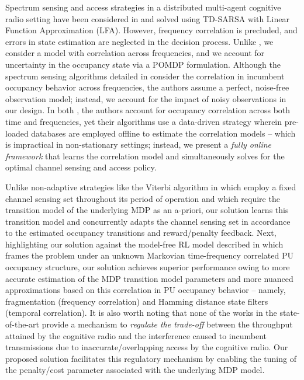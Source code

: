 \documentclass[10pt,twocolumn]{IEEEtran}
\begin{document}
Spectrum sensing and access strategies in a distributed multi-agent cognitive radio setting have been considered in \cite{6507570} and solved using TD-SARSA with Linear Function Approximation (LFA). However, frequency correlation is precluded, and errors in state estimation are neglected in the decision process. Unlike \cite{6507570}, we consider a model with correlation across frequencies, and we account for uncertainty in the occupancy state via a POMDP formulation. Although the spectrum sensing algorithms detailed in \cite{6956794} consider the correlation in incumbent occupancy behavior across frequencies, the authors assume a perfect, noise-free observation model; instead, we account for the impact of noisy observations in our design. In both \cite{6956794, 4554696}, the authors account for occupancy correlation across both time and frequencies, yet their algorithms use a data-driven strategy wherein pre-loaded databases are employed offline to estimate the correlation models -- which is impractical in non-stationary settings; instead, we present a \emph{fully online framework} that learns the correlation model and simultaneously solves for the optimal channel sensing and access policy. 

Unlike non-adaptive strategies like the Viterbi algorithm in \cite{4554696} which employ a fixed channel sensing set throughout its period of operation and which require the transition model of the underlying MDP as an a-priori, our solution learns this transition model and concurrently adapts the channel sensing set in accordance to the estimated occupancy transitions and reward/penalty feedback. Next, highlighting our solution against the model-free RL model described in \cite{DQN} which frames the problem under an unknown Markovian time-frequency correlated PU occupancy structure, our solution achieves superior performance owing to more accurate estimation of the MDP transition model parameters and more nuanced approximations based on this correlation in PU occupancy behavior -- namely, fragmentation (frequency correlation) and Hamming distance state filters (temporal correlation). It is also worth noting that none of the works in the state-of-the-art provide a mechanism to \emph{regulate the trade-off} between the throughput attained by the cognitive radio and the interference caused to incumbent transmissions due to inaccurate/overlapping access by the cognitive radio. Our proposed solution facilitates this regulatory mechanism by enabling the tuning of the penalty/cost parameter associated with the underlying MDP model. 
\end{document}
